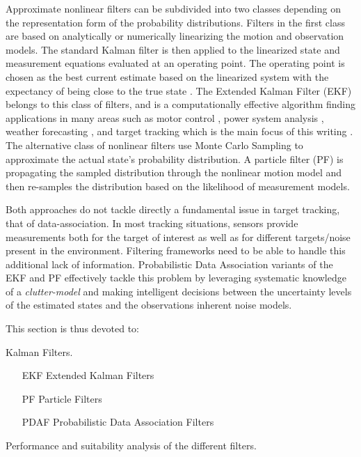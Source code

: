 Approximate nonlinear filters can be subdivided into two classes depending on the representation form of the probability distributions. Filters in the first class are based on analytically or numerically linearizing the motion and observation models. The standard Kalman filter is then applied to the linearized state and measurement equations evaluated at an operating point. The operating point is chosen as the best current estimate based on the linearized system with the expectancy of being close to the true state \cite{Shalom2001}. The Extended Kalman Filter (EKF) belongs to this class of filters, and is a computationally effective algorithm finding applications in many areas such as motor control \cite{Terzic2001}, power system analysis \cite{Khazraj2016}, weather forecasting \cite{Rosnay2012}, and target tracking which is the main focus of this writing \cite{Shalom1995}. The alternative class of nonlinear filters use Monte Carlo Sampling to approximate the actual state's probability distribution.  A particle filter (PF) is propagating the sampled distribution through the nonlinear motion model and then re-samples the distribution based on the likelihood of measurement models. 

Both approaches do not tackle directly a fundamental issue in target tracking, that of data-association. In most tracking situations, sensors provide measurements both for the target of interest as well as for different targets/noise present in the environment. Filtering frameworks need to be able to handle this additional lack of information. Probabilistic Data Association  \cite{Ristic2004} variants of the EKF and PF effectively tackle this problem by leveraging systematic knowledge of a \emph{clutter-model} and making intelligent decisions between the uncertainty levels of the estimated states and the observations inherent noise models.

This section is thus devoted to:

\begin{description}[style=nextline]
	\item[Linear filters] Kalman Filters.
	\item [Non-linear filters]
	\begin{itemize}
		\item[]
		\item[EKF] Extended Kalman Filters
		\item[PF]Particle Filters
		\item[PDAF] Probabilistic Data Association Filters 
	\end{itemize}
	\item[Comparison]Performance and suitability analysis of the different filters. 
\end{description}


